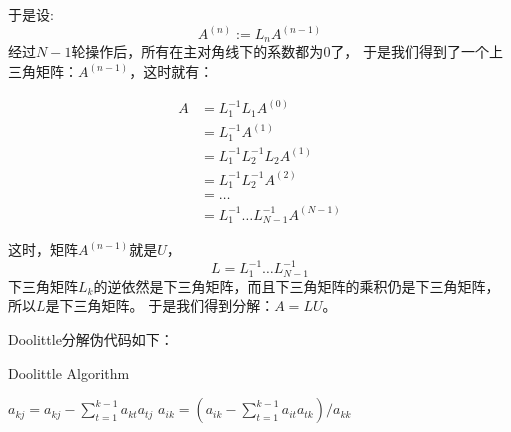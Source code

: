 于是设:
\[{\displaystyle A^{(n)}:=L_{n}A^{(n-1)}}\]
经过$N-1$轮操作后，所有在主对角线下的系数都为$0$了，
于是我们得到了一个上三角矩阵：$A^{(n-1)}$，这时就有：

\begin{align*}
A&= L_1^{ - 1}{L_1}{A^{(0)}}\\
 &= L_1^{ - 1}{A^{(1)}}\\
 &= L_1^{ - 1}L_2^{ - 1}{L_2}{A^{(1)}}\\
 &= L_1^{ - 1}L_2^{ - 1}{A^{(2)}}\\
 &=  \ldots \\
 &= L_1^{ - 1} \ldots L_{N - 1}^{ - 1}{A^{(N - 1)}}
\end{align*}

这时，矩阵$A^{(n-1)}$就是$U$，
\[\displaystyle L=L_{1}^{-1}\ldots L_{N-1}^{-1}\]
下三角矩阵$L_{k}$的逆依然是下三角矩阵，而且下三角矩阵的乘积仍是下三角矩阵，所以$L$是下三角矩阵。 
于是我们得到分解：$A=LU$。

Doolittle分解伪代码如下：

\begin{algorithm}[h]  
\caption{Doolittle Algorithm}  
\begin{algorithmic}[1]  
\STATE ${a_{kj}} = {a_{kj}} - 
\sum\limits_{t = 1}^{k - 1} {{a_{kt}}{a_{tj}}} $
\ENDFOR
{}
\STATE ${a_{ik}} = ({a_{ik}} - \sum\limits_{t = 1}^{k - 1} {{a_{it}}{a_{tk}}} )/{a_{kk}}$
\ENDFOR
\ENDFOR
\end{algorithmic}  
\end{algorithm}  

